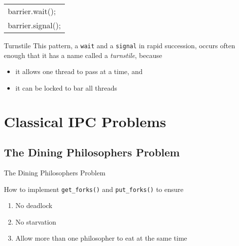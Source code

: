 \begin{frame}%
  \begin{center}\ttfamily
    \begin{tabular}{l}
      barrier.wait();\\
      barrier.signal();
    \end{tabular}
  \end{center}
  \begin{block}{Turnstile}
    This pattern, a \texttt{wait} and a \texttt{signal} in rapid succession, occurs often
    enough that it has a name called a \emph{turnstile}, because
    \begin{itemize}
    \item it allows one thread to pass at a time, and
    \item it can be locked to bar all threads
    \end{itemize}
  \end{block}
\end{frame}

\section{Classical IPC Problems}
\label{sec:class-ipc-probl}

\subsection{The Dining Philosophers Problem}
\label{sec:dining-phil-probl}

\begin{frame}{The Dining Philosophers Problem}
  \begin{center}
    \begin{minipage}{.4\linewidth}
    \end{minipage} \qquad
    \begin{minipage}{.5\linewidth}
    \end{minipage}
  \end{center}
  How to implement \texttt{get\_forks()} and \texttt{put\_forks()} to ensure
  \begin{enumerate}
  \item No deadlock
  \item No starvation
  \item Allow more than one philosopher to eat at the same time
  \end{enumerate}
\end{frame}

